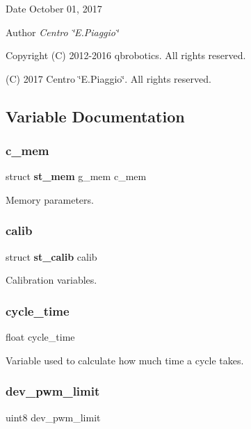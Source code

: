 \begin{DoxyDate}{Date}
October 01, 2017 
\end{DoxyDate}
\begin{DoxyAuthor}{Author}
{\itshape Centro \char`\"{}\+E.\+Piaggio\char`\"{}} 
\end{DoxyAuthor}
\begin{DoxyCopyright}{Copyright}
(C) 2012-\/2016 qbrobotics. All rights reserved. 

(C) 2017 Centro \char`\"{}\+E.\+Piaggio\char`\"{}. All rights reserved. 
\end{DoxyCopyright}


\subsection{Variable Documentation}
\mbox{\label{globals_8c_a44c3cbd8e234e0816f0334e29646a800}} 
\subsubsection{c\+\_\+mem}
{\footnotesize\ttfamily struct \textbf{ st\+\_\+mem} g\+\_\+mem c\+\_\+mem}

Memory parameters. \mbox{\label{globals_8c_aed96fdd8308fe2c4fc07c3b5db1c7bbb}} 
\subsubsection{calib}
{\footnotesize\ttfamily struct \textbf{ st\+\_\+calib} calib}

Calibration variables. \mbox{\label{globals_8c_a910e6d34a0bb2e8dbaf576e06bdf56f5}} 
\subsubsection{cycle\+\_\+time}
{\footnotesize\ttfamily float cycle\+\_\+time}

Variable used to calculate how much time a cycle takes. \mbox{\label{globals_8c_a21f4f67e4203dea0b9956589eaa6cef3}} 
\subsubsection{dev\+\_\+pwm\+\_\+limit}
{\footnotesize\ttfamily uint8 dev\+\_\+pwm\+\_\+limit}

